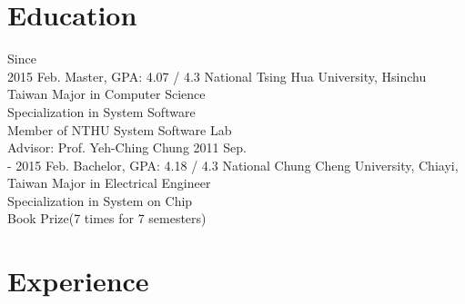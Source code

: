 \documentclass[]{friggeri-cv}
\begin{document}
\section{Education}

\begin{entrylist}
  \entry
    {Since \\
	 2015 Feb.}
    {Master, GPA: 4.07 / 4.3}
    {National Tsing Hua University, Hsinchu Taiwan}
	{Major in Computer Science \\
	Specialization in System Software \\
	Member of NTHU System Software Lab \\
	Advisor: Prof. Yeh-Ching Chung}
  \entry
    {2011 Sep. \\
	- 2015 Feb.}
    {Bachelor, GPA: 4.18 / 4.3}
    {National Chung Cheng University, Chiayi, Taiwan}
	{Major in Electrical Engineer \\
	Specialization in System on Chip \\
	Book Prize(7 times for 7 semesters)}
\end{entrylist}

\section{Experience}
\end{document}
